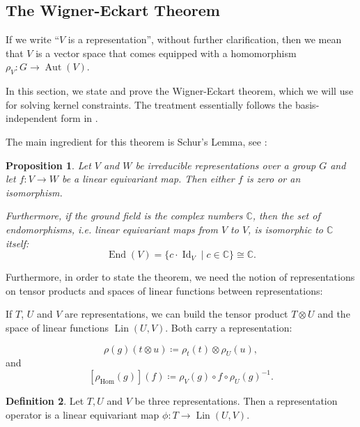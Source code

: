 \documentclass[12pt, a4paper]{article}
\theoremstyle{plain}
\newtheorem{pro}{Proposition}[section]
\theoremstyle{definition}
\newtheorem{dfn}[pro]{Definition}
\theoremstyle{remark}
\newcommand{\C}{\mathds{C}}
\DeclareMathOperator{\lin}{Lin}
\DeclareMathOperator{\aut}{Aut}
\DeclareMathOperator{\End}{End}
\DeclareMathOperator{\Id}{Id}
\begin{document}
\subsection{The Wigner-Eckart Theorem}

If we write ``$V$ is a representation'', without further clarification, then we mean that $V$ is a vector space that comes equipped with a homomorphism $\rho_V: G \to \aut (V)$.

In this section, we state and prove the Wigner-Eckart theorem, which we will use for solving kernel constraints. The treatment essentially follows the basis-independent form in \cite{wigner-eckart}.

The main ingredient for this theorem is Schur's Lemma, see \cite{Jeevanjee}:

\begin{pro}\label{Schur}
Let $V$ and $W$ be irreducible representations over a group $G$ and let $f: V \to W$ be a linear equivariant map. Then either $f$ is zero or an isomorphism.

Furthermore, if the ground field is the complex numbers $\C$, then the set of endomorphisms, i.e. linear equivariant maps from $V$ to $V$, is isomorphic to $\C$ itself:
\begin{equation*}
\End(V) = \{c \cdot \Id_V \mid c \in \C\} \cong \C.
\end{equation*}
\end{pro}

Furthermore, in order to state the theorem, we need the notion of representations on tensor products and spaces of linear functions between representations:

If $T$, $U$ and $V$ are representations, we can build the tensor product $T \otimes U$ and the space of linear functions $\lin(U, V)$. Both carry a representation:

\begin{equation*}
\rho(g)(t \otimes u) \coloneqq \rho_t(t) \otimes \rho_U(u),
\end{equation*}
and
\begin{equation*}
\left[\rho_{\text{Hom}}(g)\right](f) \coloneq \rho_V(g) \circ f \circ \rho_U(g)^{-1}.
\end{equation*}

\begin{dfn}
Let $T, U$ and $V$ be three representations. Then a representation operator is a linear equivariant map $\phi: T \to \lin(U, V)$.
\end{dfn}
\end{document}
